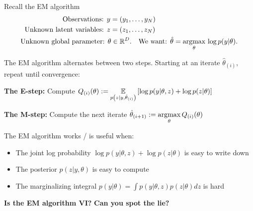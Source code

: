 



\begin{frame}{Recall the EM algorithm}
%
\vspace{-1em}
%
\begin{align*}
    \textrm{Observations: }y ={}& (y_1, \ldots, y_N)\\
    \textrm{Unknown latent variables: }z ={}& (z_1, \ldots, z_N)\\
    \textrm{Unknown global parameter: }\theta \in{}& \mathbb{R}^D.
    \quad \textrm{We want: } \hat\theta ={}
    \underset{\theta}{\mathrm{argmax}}\, \log p(y | \theta) .
\end{align*}

\pause
\hrulefill

The EM algorithm alternates between two steps.  Starting at an iterate
$\hat\theta_{(i)}$, repeat until convergence:

\textbf{The E-step:}  Compute $Q_{(i)}(\theta) := \underset{p\left(z | y, \hat\theta_{(i)} \right)}{\mathbb{E}}\left[\log p(y | \theta, z) + \log p(z | \theta)\right]$

\textbf{The M-step:}  Compute the next iterate $\hat\theta_{(i + 1)} := \underset{\theta}{\mathrm{argmax}}\, Q_{(i)}(\theta)$

\pause
\hrulefill

The EM algorithm works / is useful when:

\begin{itemize}
    \item The joint log probability $\log p(y | \theta, z) + \log p(z | \theta)$ is easy to write down
    \item The posterior $p(z | y, \theta)$ is easy to compute
    \item The marginalizing integral $p(y | \theta) = \int p(y | \theta, z) p(z | \theta) dz$ is hard
\end{itemize}

\pause

\hrulefill
\begin{center}
\textbf{Is the EM algorithm VI?} \hspace{5em}\textbf{Can you spot the lie?}
\end{center}

\end{frame}




